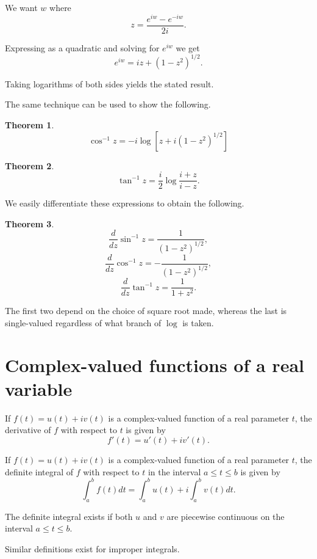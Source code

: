 \documentclass[a4paper,10pt]{article}
\newtheorem{theorem}{Theorem}[section]
\newenvironment{definition}[1][Definition]{\begin{trivlist}
\item[\hskip \labelsep {\bfseries #1}]}{\end{trivlist}}
\begin{document}
We want $w$ where
$$z = \frac{e^{iw} - e^{-iw}}{2i}.$$

Expressing as a quadratic and solving for $e^{iw}$ we get
$$e^{iw} = iz + (1 - z^2)^{1/2}.$$

Taking logarithms of both sides yields the stated result.

The same technique can be used to show the following.

\begin{theorem}
$$\cos^{-1} z = -i\log\left[z + i(1 - z^2)^{1/2}\right]$$
\end{theorem}

\begin{theorem}
$$\tan^{-1} z = \frac{i}{2}\log\frac{i+z}{i-z}.$$
\end{theorem}

We easily differentiate these expressions to obtain the following.

\begin{theorem}
$$\frac{d}{dz}\sin^{-1} z = \frac{1}{(1 - z^2)^{1/2}},$$
$$\frac{d}{dz}\cos^{-1} z = -\frac{1}{(1 - z^2)^{1/2}},$$
$$\frac{d}{dz}\tan^{-1} z = \frac{1}{1 + z^2}.$$
\end{theorem}

The first two depend on the choice of square root made, whereas the last is single-valued regardless of what branch of $\log$ is taken.

\section{Complex-valued functions of a real variable}

\begin{definition}
If $f(t) = u(t) + iv(t)$ is a complex-valued function of a real parameter $t$, the derivative of $f$ with respect to $t$ is given by
$$f'(t) = u'(t) + iv'(t).$$
\end{definition}

\begin{definition}
If $f(t) = u(t) + iv(t)$ is a complex-valued function of a real parameter $t$, the definite integral of $f$ with respect to $t$ in the interval $a \leq t \leq b$ is given by
$$\int_a^b f(t)dt = \int_a^b u(t) + i\int_a^b v(t)dt.$$
\end{definition}

The definite integral exists if both $u$ and $v$ are piecewise continuous on the interval $a \leq t \leq b$.

Similar definitions exist for improper integrals.
\end{document}
